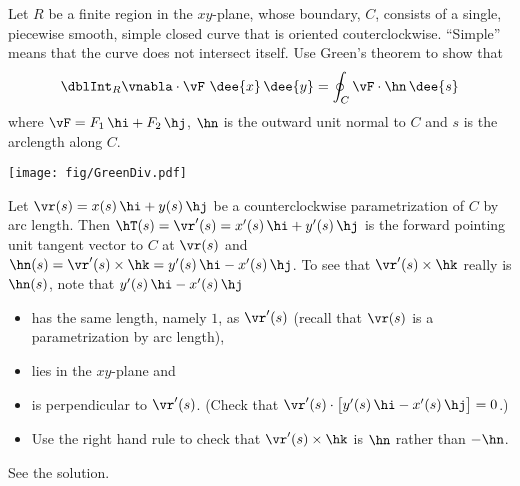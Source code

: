 \begin{question}
 Let $R$ be a finite region in the $xy$-plane,
whose boundary, $C$, consists of a single, piecewise smooth, simple
closed curve that is oriented couterclockwise.
``Simple'' means that the curve does not intersect itself.
Use Green's theorem to show that
\begin{equation*}
\dblInt_R\vnabla\cdot\vF\ \dee{x}\,\dee{y}=\oint_C\vF\cdot\hn\,\dee{s}
\end{equation*}
where $\vF=F_1\,\hi+F_2\,\hj$, $\hn$ is the outward unit normal to $C$ and $s$
is the arclength along $C$.
\begin{center}
       \texttt{[image: fig/GreenDiv.pdf]}
\end{center}

\end{question}

\begin{hint}
Let $\vr(s)=x(s)\,\hi+y(s)\,\hj$ be a counterclockwise parametrization of
$C$ by arc length. Then $\hT(s) = \vr'(s) = x'(s)\,\hi+y'(s)\,\hj$
is the forward pointing unit tangent vector to $C$ at $\vr(s)$
and $\hn(s) = \vr'(s)\times\hk=y'(s)\,\hi-x'(s)\,\hj$. To see
that $\vr'(s)\times\hk$ really is $\hn(s)$, note that
$y'(s)\,\hi-x'(s)\,\hj$
\begin{itemize}\itemsep1pt \parskip0pt 
\item
has the same length, namely $1$, as $\vr'(s)$ (recall that $\vr(s)$ is a
parametrization by arc length),
\item
lies in the $xy$-plane and

\item
is perpendicular to $\vr'(s)$.
(Check that $\vr'(s)\cdot\big[y'(s)\,\hi-x'(s)\,\hj\big]=0$.)
\item
Use the right hand rule to check that $\vr'(s)\times\hk$ is
$\hn$ rather than $-\hn$.
\end{itemize}
\end{hint}

\begin{answer}
See the solution.
\end{answer}

